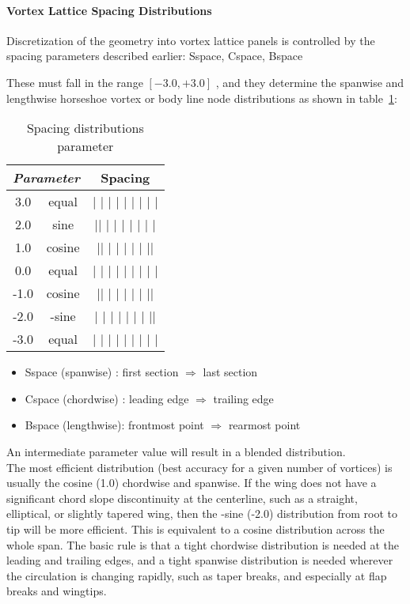 \paragraph{Vortex Lattice Spacing Distributions}

Discretization of the geometry into vortex lattice panels
is controlled by the spacing parameters described earlier:
Sspace, Cspace, Bspace

These must fall in the range  $[-3.0, +3.0]$ , and they
determine the spanwise and lengthwise horseshoe vortex 
or body line node distributions as shown in table~\ref{tab2}:

\begin{table} [!h]\centering {}
	\begin{tabular}{c c c}
		\toprule
		\multicolumn{2}{c}{\emph{Parameter}} &  Spacing  \\ 
		\midrule
	3.0    &    equal  \qquad    &     |   |   |   |   |   |   |   |   | \\
	2.0    &    sine    \qquad   &    || |  |   |    |    |     |     | \\
	1.0    &    cosine   \qquad  &    ||  |    |      |      |    |  || \\
	0.0    &    equal    \qquad  &   |   |   |   |   |   |   |   |   | \\
	-1.0    &    cosine  \qquad  &    ||  |    |      |      |    |  || \\
	-2.0    &   -sine    \qquad  &    |     |     |    |    |   |  | || \\
	-3.0    &    equal  \qquad   &     |   |   |   |   |   |   |   |   | \\
		\bottomrule
	\end{tabular}
	\caption {\footnotesize Spacing distributions parameter}
	\label{tab2}
\end{table}
\begin{itemize}
\item Sspace (spanwise)  :    first section        $\Longrightarrow$       last section
\item Cspace (chordwise) :    leading edge         $\Longrightarrow$       trailing edge
\item Bspace (lengthwise):    frontmost point      $\Longrightarrow$       rearmost point
\end{itemize}
An intermediate parameter value will result in a blended distribution.\\

The most efficient distribution (best accuracy for a given number of 
vortices) is usually the cosine (1.0) chordwise and spanwise.  If the 
wing does not have a significant chord slope discontinuity at the 
centerline, such as a straight, elliptical, or slightly tapered wing, 
then the -sine (-2.0) distribution from root to tip will be more 
efficient.  This is equivalent to a cosine distribution across the 
whole span.  The basic rule is that a tight chordwise distribution 
is needed at the leading and trailing edges, and a tight spanwise 
distribution is needed wherever the circulation is changing rapidly, 
such as taper breaks, and especially at flap breaks and wingtips.\\

